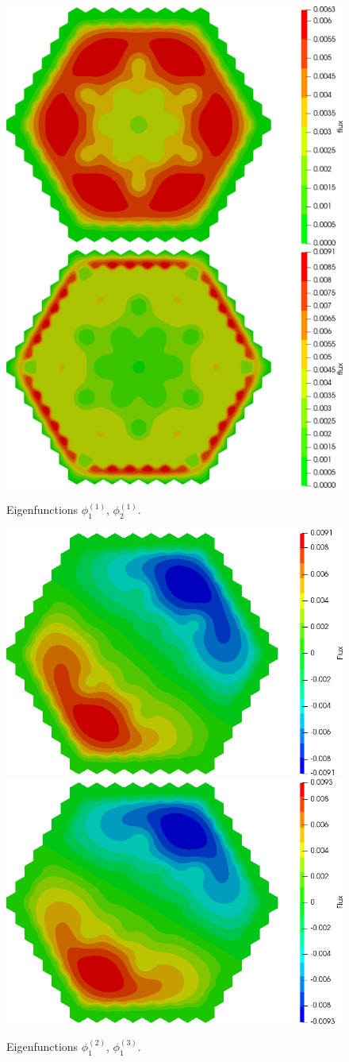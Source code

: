 \documentclass[authoryear]{elsarticle}
\begin{document}
\begin{figure}[H]
\begin{center}
	\includegraphics[width=0.49\linewidth]{iaea_with/alpha_delayed_sp3_u1_1.png}
	\includegraphics[width=0.49\linewidth]{iaea_with/alpha_delayed_sp3_u2_1.png}\\
	\caption{Eigenfunctions $\phi_1^{(1)}$, $\phi_2^{(1)}$.}
	\label{fig:iaea_with_fun_del_1}
\end{center}
\end{figure}
\begin{figure}[H]
\begin{center}
	\includegraphics[width=0.49\linewidth]{iaea_with/alpha_delayed_sp3_u1_2.png}
	\includegraphics[width=0.49\linewidth]{iaea_with/alpha_delayed_sp3_u1_3.png}\\
	\caption{Eigenfunctions $\phi_1^{(2)}$, $\phi_1^{(3)}$.}
	\label{fig:iaea_with_fun_del_2}
\end{center}
\end{figure}
\end{document}
